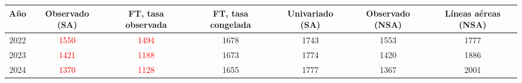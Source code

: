 \begin{tabular}{ccccccc}
\toprule
A\~no & Observado (SA) & FT, tasa observada & FT, tasa congelada & Univariado (SA) & Observado (NSA) & L\'ineas a\'ereas (NSA)
\\ \midrule
2022 & \textcolor{red}{1550} & \textcolor{red}{1494} & 1678 & 1743 & 1553 & 1777 \\
2023 & \textcolor{red}{1421} & \textcolor{red}{1188} & 1673 & 1774 & 1420 & 1886 \\
2024 & \textcolor{red}{1370} & \textcolor{red}{1128} & 1655 & 1777 & 1367 & 2001 \\
\bottomrule
\end{tabular}
